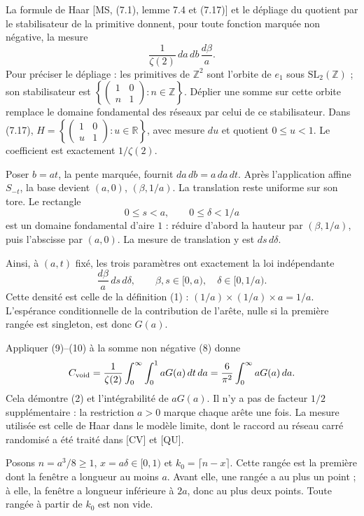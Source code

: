 \documentclass[11pt,a4paper]{article}
\newcommand{\R}{\mathbb R}\newcommand{\Z}{\mathbb Z}
\newcommand{\head}[1]{\vspace{3pt}{\large\bfseries\color{navy}#1}\par}
\begin{document}
La formule de Haar [MS, (7.1), lemme 7.4 et (7.17)] et le dépliage du quotient par le stabilisateur de la primitive donnent, pour toute fonction marquée non négative, la mesure
\[
 \frac1{\zeta(2)}\,da\,db\,\frac{d\beta}{a}.
 \tag{9}
\]
Pour préciser le dépliage : les primitives de $\Z^2$ sont l'orbite de $e_1$ sous $\mathrm{SL}_2(\Z)$ ; son stabilisateur est $\left\{\left(\begin{smallmatrix}1&0\\ n&1\end{smallmatrix}\right):n\in\Z\right\}$. Déplier une somme sur cette orbite remplace le domaine fondamental des réseaux par celui de ce stabilisateur. Dans (7.17), $H=\left\{\left(\begin{smallmatrix}1&0\\ u&1\end{smallmatrix}\right):u\in\R\right\}$, avec mesure $du$ et quotient $0\le u<1$. Le coefficient est exactement $1/\zeta(2)$.

Poser $b=at$, la pente marquée, fournit $da\,db=a\,da\,dt$. Après l'application affine $S_{-t}$, la base devient $(a,0)$, $(\beta,1/a)$. La translation reste uniforme sur son tore. Le rectangle
\[
 0\le s<a,\qquad 0\le\delta<1/a
\]
est un domaine fondamental d'aire $1$ : réduire d'abord la hauteur par $(\beta,1/a)$, puis l'abscisse par $(a,0)$. La mesure de translation y est $ds\,d\delta$.

Ainsi, à $(a,t)$ fixé, les trois paramètres ont exactement la loi indépendante
\[
 \frac{d\beta}{a}\,ds\,d\delta,
 \qquad \beta,s\in[0,a),\quad\delta\in[0,1/a).
 \tag{10}
\]
Cette densité est celle de la définition (1) : $(1/a)\times(1/a)\times a=1/a$. L'espérance conditionnelle de la contribution de l'arête, nulle si la première rangée est singleton, est donc $G(a)$.

Appliquer (9)--(10) à la somme non négative (8) donne
\[
 C_{\rm void}
 =\frac1{\zeta(2)}\int_0^\infty\int_0^1 aG(a)\,dt\,da
 =\frac6{\pi^2}\int_0^\infty aG(a)\,da.
\]
Cela démontre (2) et l'intégrabilité de $aG(a)$. Il n'y a pas de facteur $1/2$ supplémentaire : la restriction $a>0$ marque chaque arête une fois. La mesure utilisée est celle de Haar dans le modèle limite, dont le raccord au réseau carré randomisé a été traité dans [CV] et [QU].

\newpage
\head{5. Une formule exacte pour toute la queue $a\ge2$}
Posons $n=a^3/8\ge1$, $x=a\delta\in[0,1)$ et $k_0=\lceil n-x\rceil$. Cette rangée est la première dont la fenêtre a longueur au moins $a$. Avant elle, une rangée a au plus un point ; à elle, la fenêtre a longueur inférieure à $2a$, donc au plus deux points. Toute rangée à partir de $k_0$ est non vide.
\end{document}
